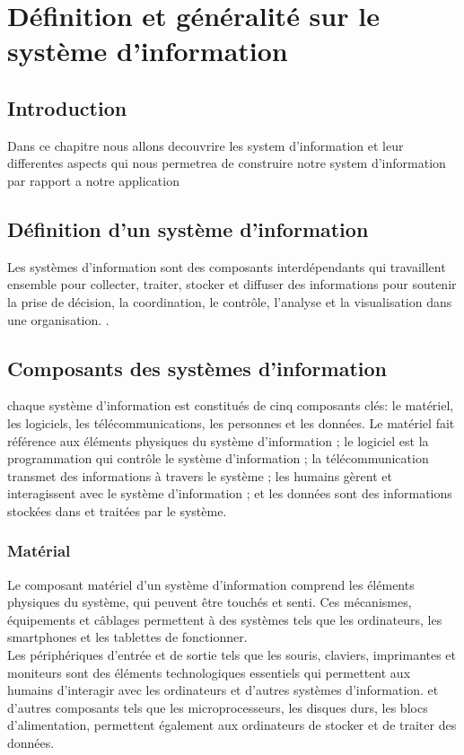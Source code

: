 \chapter{Définition et généralité sur le système d'information }
\section{Introduction }

\par Dans ce chapitre nous allons decouvrire les system d'information et leur
differentes aspects qui nous permetrea de construire notre system d'information
par rapport a notre application


\section{Définition d'un système d'information }
\par Les systèmes d'information sont des composants interdépendants qui
travaillent ensemble pour collecter, traiter, stocker et diffuser des
informations pour soutenir la prise de décision, la coordination, le contrôle,
l'analyse et la visualisation dans une organisation.
\cite{ref1}.

\section{Composants des systèmes d'information }
\par chaque système d'information est constitués de cinq composants clés: le
matériel, les logiciels, les télécommunications, les personnes et les données.
Le matériel fait référence aux éléments physiques du système d'information ; le
logiciel est la programmation qui contrôle le système d'information ; la
télécommunication transmet des informations à travers le système ; les humains
gèrent et interagissent avec le système d'information ; et les données sont des
informations stockées dans et traitées par le système.\cite{ref11}

\subsection{Matérial }
\par Le composant matériel d'un système d'information comprend les éléments
physiques du système, qui peuvent être touchés et senti. Ces mécanismes,
équipements et câblages permettent à des systèmes tels que les ordinateurs, les
smartphones et les tablettes de fonctionner.\\
Les périphériques d'entrée et de sortie tels que les souris, claviers,
imprimantes et moniteurs sont des éléments technologiques essentiels qui
permettent aux humains d'interagir avec les ordinateurs et d'autres systèmes
d'information. et d’autres composants tels que les microprocesseurs, les
disques durs, les blocs d'alimentation, permettent également aux ordinateurs de
stocker et de traiter des données.\cite{ref11}

